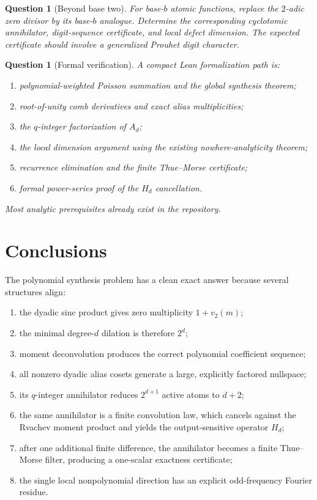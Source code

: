 \documentclass[11pt,oneside]{article}
\newtheorem{question}[theorem]{Question}
\theoremstyle{definition}
\theoremstyle{remark}
\newcommand{\vtwo}{v_2}
\begin{document}
\begin{question}[Beyond base two]
For base-$b$ atomic functions, replace the $2$-adic zero divisor by its base-$b$ analogue.  Determine the corresponding cyclotomic annihilator, digit-sequence certificate, and local defect dimension.  The expected certificate should involve a generalized Prouhet digit character.
\end{question}

\begin{question}[Formal verification]
A compact Lean formalization path is:
\begin{enumerate}
\item polynomial-weighted Poisson summation and the global synthesis theorem;
\item root-of-unity comb derivatives and exact alias multiplicities;
\item the $q$-integer factorization of $A_d$;
\item the local dimension argument using the existing nowhere-analyticity theorem;
\item recurrence elimination and the finite Thue--Morse certificate;
\item formal power-series proof of the $H_d$ cancellation.
\end{enumerate}
Most analytic prerequisites already exist in the repository.
\end{question}

\section{Conclusions}

The polynomial synthesis problem has a clean exact answer because several structures align:
\begin{enumerate}
\item the dyadic sinc product gives zero multiplicity $1+\vtwo(m)$;
\item the minimal degree-$d$ dilation is therefore $2^d$;
\item moment deconvolution produces the correct polynomial coefficient sequence;
\item all nonzero dyadic alias cosets generate a large, explicitly factored nullspace;
\item its $q$-integer annihilator reduces $2^{d+1}$ active atoms to $d+2$;
\item the same annihilator is a finite convolution law, which cancels against the Rvachev moment product and yields the output-sensitive operator $H_d$;
\item after one additional finite difference, the annihilator becomes a finite Thue--Morse filter, producing a one-scalar exactness certificate;
\item the single local nonpolynomial direction has an explicit odd-frequency Fourier residue.
\end{enumerate}
\end{document}
